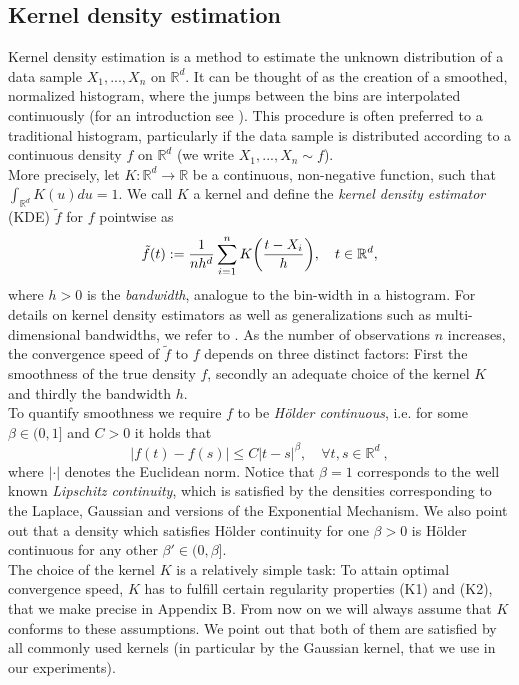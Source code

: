 \documentclass[conference]{IEEEtran}
\begin{document}
\subsection{Kernel density estimation} \label{Subsec_2_B}
Kernel density estimation is a method to estimate the unknown distribution of a data sample $X_1,...,X_n$ on $\mathbb{R}^d$. 
It can be thought of as the creation of a smoothed, normalized histogram, where the jumps between the bins are interpolated continuously (for an introduction see \cite{scott}). This procedure is often preferred to a traditional histogram, particularly if the data sample is distributed according to a continuous density $f$ on $\mathbb{R}^d$ (we write $X_1,...,X_n \sim f$).  \\
More precisely, let $K: \mathbb{R}^d \to \mathbb{R}$ be a continuous, non-negative function, such that $\int_{\mathbb{R}^d} K(u) du =1$. We call $K$ a kernel and define the \textit{kernel density estimator} (KDE) $\tilde f$ for $f$ pointwise as 
\begin{equation} \label{Eq_def_KDE}
    \tilde f(t) := {1 \over nh^d} \sum_{i=1}^n K \bigg( {t-X_i \over h} \bigg), \quad t \in \mathbb{R}^d,
\end{equation}
where $h>0$ is the \textit{bandwidth}, analogue to the bin-width in a histogram. For details on kernel density estimators as well as generalizations such as multi-dimensional bandwidths, we refer to \cite{Gramacki}. 
As the number of observations $n$ increases, the convergence speed of $\tilde f$ to $f$ depends on three distinct factors: First the smoothness of the true density $f$, secondly
an adequate choice of the kernel $K$ and thirdly the bandwidth $h$.\\
To quantify smoothness we require $f$ to be \textit{Hölder continuous}, i.e. for some $\beta \in (0,1]$  and $C>0$ it holds that 
\begin{equation}\label{Eq_Hoelder}
    |f(t)-f(s)| \le C |t-s|^\beta, \quad \forall t,s \in \mathbb{R}^d~,
\end{equation}
where $|\cdot|$ denotes the Euclidean norm. Notice that $\beta=1$ corresponds to the well known \textit{Lipschitz continuity}, which is satisfied by the densities corresponding to the Laplace, Gaussian and versions of the Exponential Mechanism. We also point out that a density which satisfies Hölder continuity for one $\beta>0$ is  Hölder continuous for any other $\beta' \in (0, \beta]$. \\
The choice of the kernel $K$ is a relatively simple task: To attain optimal convergence speed, $K$ has to fulfill certain regularity properties (K1) and (K2), that we make precise in Appendix B. From now on we will always assume that $K$ conforms to these assumptions. We point out that both of them are satisfied by all commonly used  kernels (in particular by the Gaussian kernel, that we use in our experiments).
\end{document}
